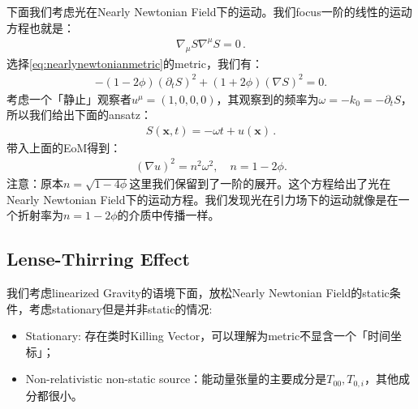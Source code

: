 \bigskip
{}

下面我们考虑光在Nearly Newtonian Field下的运动。我们focus一阶的线性的运动方程也就是：
\begin{align}
  \nabla_\mu S \nabla^\mu S = 0 \, .
\end{align}
选择\cref{eq:nearlynewtonianmetric}的metric，我们有：
\begin{align}
  -(1-2\phi)(\partial_tS)^2+(1+2\phi)(\nabla S)^2=0.
\end{align}
考虑一个「静止」观察者$ u^\mu = (1,0,0,0) $，其观察到的频率为$ \omega = -k_0 =
-\partial_{t}S $，所以我们给出下面的ansatz：
\begin{align}
  S(\mathbf{x},t) = -\omega t + u(\mathbf{x}) \, .
\end{align}
带入上面的EoM得到：
\begin{align}
  (\nabla u)^2=n^2\omega^2,\quad n=1-2\phi.
\end{align}
注意：原本$ n = \sqrt{1-4 \phi} $这里我们保留到了一阶的展开。这个方程给出了光在Nearly Newtonian
Field下的运动方程。我们发现光在引力场下的运动就像是在一个折射率为$ n = 1 - 2\phi $的介质中传播一样。

\subsection{Lense-Thirring Effect}


我们考虑linearized Gravity的语境下面，放松Nearly Newtonian
Field的static条件，考虑stationary但是并非static的情况:
\begin{itemize}
  \item Stationary: 存在类时Killing Vector，可以理解为metric不显含一个「时间坐标」；
  \item Non-relativistic non-static source：能动量张量的主要成分是$ T_{00} ,
    T_{0,i} $，其他成分都很小。
\end{itemize}

\bigskip
{}

